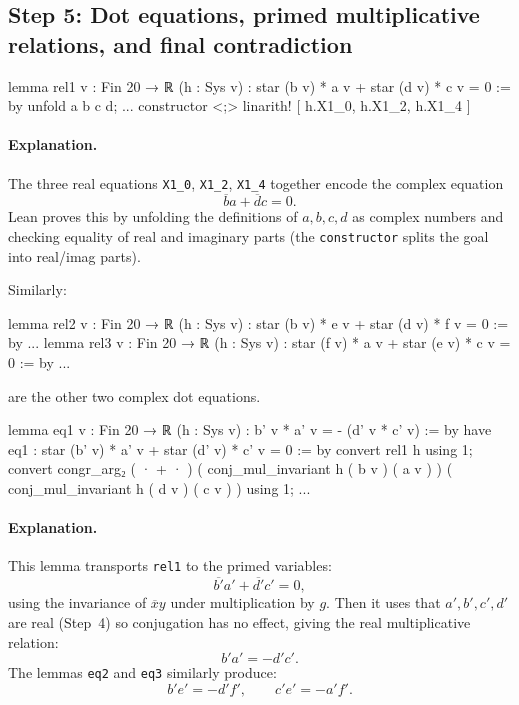 \documentclass[11pt]{article}
\begin{document}
\subsection*{Step 5: Dot equations, primed multiplicative relations, and final contradiction}

\begin{LeanCode}
lemma rel1 {v : Fin 20 → ℝ} (h : Sys v) : star (b v) * a v + star (d v) * c v = 0 := by
  unfold a b c d; ...
  constructor <;> linarith! [ h.X1_0, h.X1_2, h.X1_4 ]
\end{LeanCode}

\paragraph{Explanation.}
The three real equations \texttt{X1\_0}, \texttt{X1\_2}, \texttt{X1\_4} together encode the complex equation
\[
\overline{b}a+\overline{d}c=0.
\]
Lean proves this by unfolding the definitions of $a,b,c,d$ as complex numbers and checking equality of real and imaginary parts (the \texttt{constructor} splits the goal into real/imag parts).

Similarly:
\begin{LeanCode}
lemma rel2 {v : Fin 20 → ℝ} (h : Sys v) : star (b v) * e v + star (d v) * f v = 0 := by
  ...
lemma rel3 {v : Fin 20 → ℝ} (h : Sys v) : star (f v) * a v + star (e v) * c v = 0 := by
  ...
\end{LeanCode}
are the other two complex dot equations.

\begin{LeanCode}
lemma eq1 {v : Fin 20 → ℝ} (h : Sys v) : b' v * a' v = - (d' v * c' v) := by
  have eq1 : star (b' v) * a' v + star (d' v) * c' v = 0 := by
    convert rel1 h using 1;
    convert congr_arg₂ ( · + · )
      ( conj_mul_invariant h ( b v ) ( a v ) )
      ( conj_mul_invariant h ( d v ) ( c v ) ) using 1;
  ...
\end{LeanCode}

\paragraph{Explanation.}
This lemma transports \texttt{rel1} to the primed variables:
\[
\overline{b'}a'+\overline{d'}c'=0,
\]
using the invariance of $\overline{x}y$ under multiplication by $g$.
Then it uses that $a',b',c',d'$ are real (Step~4) so conjugation has no effect, giving the real multiplicative relation:
\[
b'a'=-d'c'.
\]
The lemmas \texttt{eq2} and \texttt{eq3} similarly produce:
\[
b'e'=-d'f',\qquad c'e'=-a'f'.
\]
\end{document}
